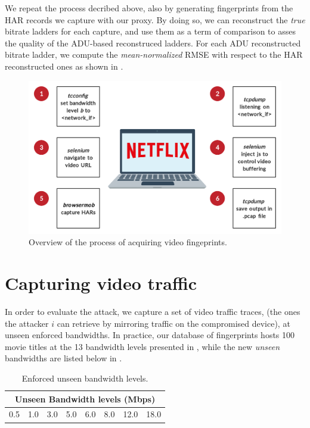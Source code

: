 We repeat the process decribed above, also by generating fingerprints from the
HAR records we capture with our proxy. By doing so, we can reconstruct the
\emph{true} bitrate ladders for each capture, and use them as a term of
comparison to asses the quality of the ADU-based reconstruced ladders. For each
ADU reconstructed bitrate ladder, we compute the \emph{mean-normalized} RMSE
with respect to the HAR reconstructed ones as shown in .

\begin{figure}[!h]
  \centering
  \includegraphics[width=.7\columnwidth]{img/fingerprints.png}
  \caption{Overview of the process of acquiring video fingeprints.}
  \label{fig:fingerprints}
\end{figure}


\section{Capturing video traffic}\label{sec:testing}

In order to evaluate the attack, we capture a set of video traffic traces, (the
ones the attacker $i$ can retrieve by mirroring traffic on the compromised
device), at unseen enforced bandwidths. In practice, our database of
fingerprints hosts 100 movie titles at the 13 bandwidth levels presented in
, while the new \emph{unseen} bandwidths are listed below
in .

\begin{table}[htb]
  \centering
  \begin{tabular}{|c|c|c|c|c|c|c|c|}
    \hline
    \multicolumn{8}{|c|}{\textbf{Unseen Bandwidth levels (Mbps)}} \\
    \hline
    0.5 & 1.0 & 3.0 & 5.0 & 6.0 & 8.0 & 12.0 & 18.0 \\
    \hline
  \end{tabular}
  \caption{Enforced unseen bandwidth levels.}
  \label{tab:unseen_bandwidths}
\end{table}

